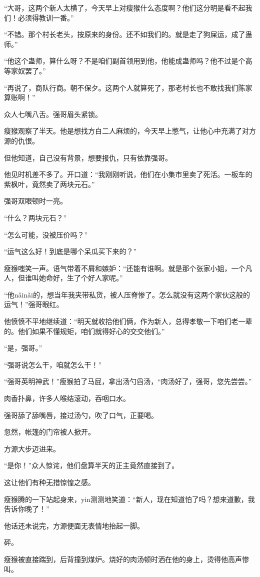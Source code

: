 \begin{this_body}
“大哥，这两个新人太横了，今天早上对瘦猴什么态度啊？他们这分明是看不起我们！必须得教训一番。”

“不错。那个村长老头，按原来的身份。还不如我们的。就是走了狗屎运，成了蛊师。”

“他这个蛊师，算什么呀？不是咱们副首领用到他，他能成蛊师吗？他不过是个高等家奴罢了。”

“再说了，商队行商。朝不保夕。这两个人就算死了，那老村长也不敢找我们陈家算账啊！”

众人七嘴八舌。强哥眉头紧锁。

瘦猴观察了半天。他是想找方白二人麻烦的，今天早上憋气，让他心中充满了对方源的仇恨。

但他知道，自己没有背景，想要报仇，只有依靠强哥。

他见时机差不多了。开口道：“我刚刚听说，他们在小集市里卖了死活。一板车的紫枫叶，竟然卖了两块元石。”

强哥双眼顿时一亮。

“什么？两块元石？”

“怎么可能，没被压价吗？”

“运气这么好！到底是哪个呆瓜买下来的？”

瘦猴嗤笑一声。语气带着不屑和嫉妒：“还能有谁啊。就是那个张家小姐，一个凡人，但谁叫她命好，生了个好人家呢。”

“他nǎinǎi的，想当年我夹带私货，被人压脊惨了。怎么就没有这两个家伙这般的运气！”强哥眼红。

他愤愤不平地继续道：“明天就收拾他们俩，作为新人，总得孝敬一下咱们老一辈的。他们如果不懂规矩，咱们就得好心的交交他们。”

“是，强哥。”

“强哥说怎么干，咱就怎么干！”

“强哥英明神武！”瘦猴拍了马屁，拿出汤勺舀汤，“肉汤好了，强哥，您先尝尝。”

肉香扑鼻，许多人喉结滚动，吞咽口水。

强哥舔了舔嘴唇，接过汤勺，吹了口气，正要喝。

忽然，帐篷的门帘被人掀开。

方源大步迈进来。

“是你！”众人惊诧，他们盘算半天的正主竟然直接到了。

这让他们有种无措惊惶之感。

瘦猴腾的一下站起身来，yin测测地笑道：“新人，现在知道怕了吗？想来道歉，我告诉你晚了！”

他话还未说完，方源便面无表情地抬起一脚。

砰。

瘦猴被直接踹到，后背撞到煤炉。烧好的肉汤顿时洒在他的身上，烫得他高声惨叫。


\end{this_body}

